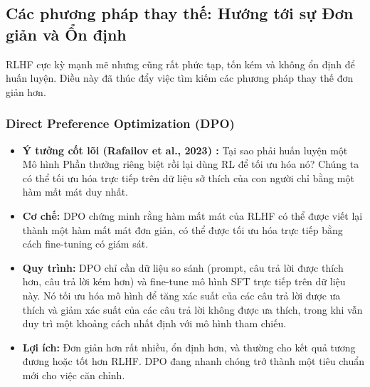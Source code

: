 \subsection{Các phương pháp thay thế: Hướng tới sự Đơn giản và Ổn định}
\label{ssec:rlhf_alternatives}
RLHF cực kỳ mạnh mẽ nhưng cũng rất phức tạp, tốn kém và không ổn định để huấn luyện. Điều này đã thúc đẩy việc tìm kiếm các phương pháp thay thế đơn giản hơn.

\subsubsection{Direct Preference Optimization (DPO)}
\begin{itemize}
    \item \textbf{Ý tưởng cốt lõi (Rafailov et al., 2023) \cite{rafailov2023direct}:} Tại sao phải huấn luyện một Mô hình Phần thưởng riêng biệt rồi lại dùng RL để tối ưu hóa nó? Chúng ta có thể tối ưu hóa trực tiếp trên dữ liệu sở thích của con người chỉ bằng một hàm mất mát duy nhất.
    \item \textbf{Cơ chế:} DPO chứng minh rằng hàm mất mát của RLHF có thể được viết lại thành một hàm mất mát đơn giản, có thể được tối ưu hóa trực tiếp bằng cách fine-tuning có giám sát.
    \item \textbf{Quy trình:} DPO chỉ cần dữ liệu so sánh (prompt, câu trả lời được thích hơn, câu trả lời kém hơn) và fine-tune mô hình SFT trực tiếp trên dữ liệu này. Nó tối ưu hóa mô hình để tăng xác suất của các câu trả lời được ưa thích và giảm xác suất của các câu trả lời không được ưa thích, trong khi vẫn duy trì một khoảng cách nhất định với mô hình tham chiếu.
    \item \textbf{Lợi ích:} Đơn giản hơn rất nhiều, ổn định hơn, và thường cho kết quả tương đương hoặc tốt hơn RLHF. DPO đang nhanh chóng trở thành một tiêu chuẩn mới cho việc căn chỉnh.
\end{itemize}


